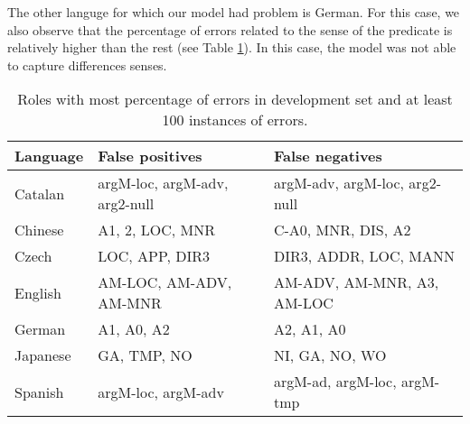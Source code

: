 The other languge for which our model had problem is German. For this case, we 
also observe that the percentage of errors related to the sense of the predicate 
is relatively higher than the rest (see Table \ref{tbl:percentage}). In this 
case, the model was not able to capture differences senses.

\begin{table}
\begin{center}
\small
\begin{tabular}{|l|p{2cm}|p{2cm}| }\hline
Language        & False positives        & False negatives\\\hline
Catalan         & argM-loc, argM-adv, arg2-null & argM-adv, argM-loc, arg2-null 
\\
Chinese         & A1, 2, LOC, MNR  & C-A0, MNR, DIS, A2  \\
Czech           & LOC, APP, DIR3   & DIR3, ADDR, LOC, MANN   \\
English         & AM-LOC, AM-ADV, AM-MNR& AM-ADV, AM-MNR, A3, AM-LOC   \\
German          & A1, A0, A2 & A2, A1, A0   \\
Japanese        & GA, TMP, NO  & NI, GA, NO, WO \\
Spanish         & argM-loc, argM-adv & argM-ad, argM-loc, argM-tmp  \\
\hline
\end{tabular}
\caption{Roles with most percentage of errors in development set and at least 
100 instances of errors.}
\label{tbl:percentage}
\normalsize
\end{center}
\end{table}







